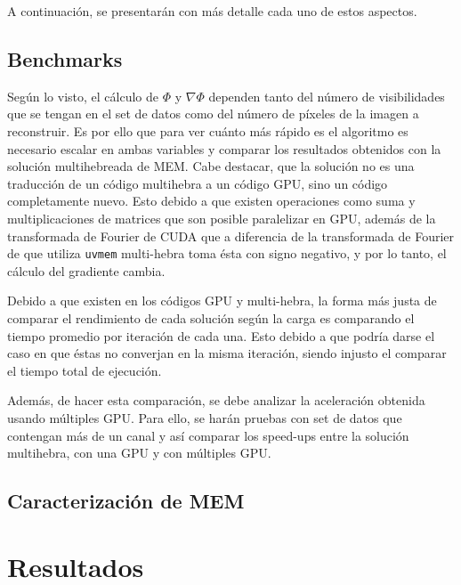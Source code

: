 A continuación, se presentarán con más detalle cada uno de estos aspectos.

\section{Benchmarks}
Según lo visto, el cálculo de $\Phi$ y $\nabla \Phi$ dependen tanto del número de visibilidades que se tengan en el set de datos como del número de píxeles de la imagen a reconstruir. Es por ello que para ver cuánto más rápido es el algoritmo es necesario escalar en ambas variables y comparar los resultados obtenidos con la solución multihebreada de MEM. Cabe destacar, que la solución no es una traducción de un código multihebra a un código GPU, sino un código completamente nuevo. Esto debido a que existen operaciones como suma y multiplicaciones de matrices que son posible paralelizar en GPU, además de la transformada de Fourier de CUDA \citep{cudafft} que a diferencia de la transformada de Fourier de \citep{numericalrecipes} que utiliza \texttt{uvmem} multi-hebra toma ésta con signo negativo, y por lo tanto, el cálculo del gradiente cambia.

Debido a que existen en los códigos GPU y multi-hebra, la forma más justa de comparar el rendimiento de cada solución según la carga es comparando el tiempo promedio por iteración de cada una. Esto debido a que podría darse el caso en que éstas no converjan en la misma iteración, siendo injusto el comparar el tiempo total de ejecución.

Además, de hacer esta comparación, se debe analizar la aceleración obtenida usando múltiples GPU. Para ello, se harán pruebas con set de datos que contengan más de un canal y así comparar los speed-ups entre la solución multihebra, con una GPU y con múltiples GPU.

\section{Caracterización de MEM}

\chapter{Resultados}
\label{cap:resultados}
